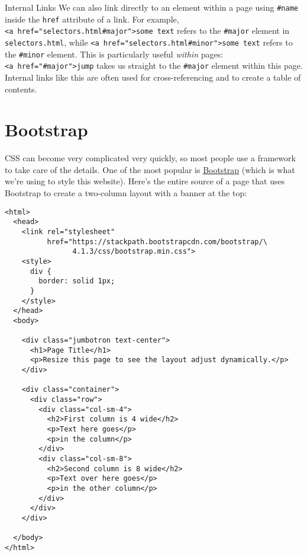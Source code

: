 \begin{aside}{Internal Links}
  We can also link directly to an element within a page using \texttt{\#name}
  inside the \texttt{href} attribute of a link.
  For example,
  \texttt{{\textless}a\ href="selectors.html\#major"{\textgreater}some\ text}
  refers to the \texttt{\#major} element in \texttt{selectors.html},
  while \texttt{{\textless}a\ href="selectors.html\#minor"{\textgreater}some\ text}
  refers to the \texttt{\#minor} element.
  This is particularly useful \emph{within} pages:
  \texttt{{\textless}a\ href="\#major"{\textgreater}jump}
  takes us straight to the \texttt{\#major} element within this page.
  Internal links like this are often used for cross-referencing and to create a table of contents.
\end{aside}

\section{Bootstrap}\label{s:htmlcss-bootstrap}

CSS can become very complicated very quickly,
so most people use a framework to take care of the details.
One of the most popular is \href{https://getbootstrap.com/}{Bootstrap}
(which is what we're using to style this website).
Here's the entire source of a page that uses Bootstrap
to create a two-column layout with a banner at the top:

\begin{verbatim}
<html>
  <head>
    <link rel="stylesheet"
          href="https://stackpath.bootstrapcdn.com/bootstrap/\
                4.1.3/css/bootstrap.min.css">
    <style>
      div {
        border: solid 1px;
      }
    </style>
  </head>
  <body>

    <div class="jumbotron text-center">
      <h1>Page Title</h1>
      <p>Resize this page to see the layout adjust dynamically.</p>
    </div>

    <div class="container">
      <div class="row">
        <div class="col-sm-4">
          <h2>First column is 4 wide</h2>
          <p>Text here goes</p>
          <p>in the column</p>
        </div>
        <div class="col-sm-8">
          <h2>Second column is 8 wide</h2>
          <p>Text over here goes</p>
          <p>in the other column</p>
        </div>
      </div>
    </div>

  </body>
</html>
\end{verbatim}


